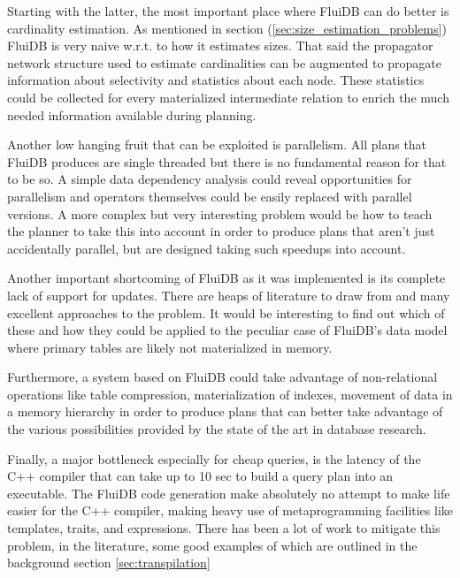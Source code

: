 Starting with the latter, the most important place where FluiDB can do
better is cardinality estimation. As mentioned in section
(\ref{sec:size_estimation_problems}) FluiDB is very naive w.r.t. to
how it estimates sizes. That said the propagator network structure
used to estimate cardinalities can be augmented to propagate
information about selectivity and statistics about each node. These
statistics could be collected for every materialized intermediate
relation to enrich the much needed information available during
planning.

Another low hanging fruit that can be exploited is parallelism. All
plans that FluiDB produces are single threaded but there is no
fundamental reason for that to be so. A simple data dependency
analysis could reveal opportunities for parallelism and operators
themselves could be easily replaced with parallel versions. A more
complex but very interesting problem would be how to teach the planner
to take this into account in order to produce plans that aren't just
accidentally parallel, but are designed taking such speedups into
account.

Another important shortcoming of FluiDB as it was implemented is its
complete lack of support for updates. There are heaps of literature to
draw from and many excellent approaches to the problem. It would be
interesting to find out which of these and how they could be applied
to the peculiar case of FluiDB's data model where primary tables are
likely not materialized in memory.

Furthermore, a system based on FluiDB could take advantage of
non-relational operations like table compression, materialization of
indexes, movement of data in a memory hierarchy in order to produce
plans that can better take advantage of the various possibilities
provided by the state of the art in database research.

Finally, a major bottleneck especially for cheap queries, is the
latency of the C++ compiler that can take up to 10 sec to build a
query plan into an executable. The FluiDB code generation make
absolutely no attempt to make life easier for the C++ compiler, making
heavy use of metaprogramming facilities like templates, traits, and
 expressions. There has been a lot of work to mitigate
this problem, in the literature, some good examples of which are
outlined in the background section \ref{sec:transpilation}

